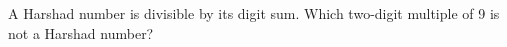 A Harshad number is divisible by its digit sum. Which two-digit multiple of 9 is not a Harshad number?
